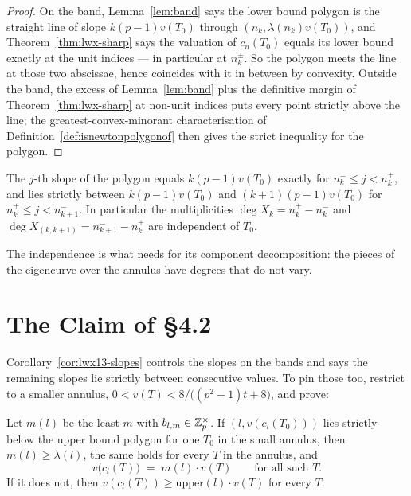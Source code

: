 \begin{proof}
  \leanok
  On the band, Lemma~\ref{lem:band} says the lower bound polygon is the straight line of slope
  $k(p-1)v(T_0)$ through $(n_k, \lambda(n_k)v(T_0))$, and Theorem~\ref{thm:lwx-sharp} says the
  valuation of $c_n(T_0)$ equals its lower bound exactly at the unit indices --- in particular at
  $n_k^{\pm}$.  So the polygon meets the line at those two abscissae, hence coincides with it in
  between by convexity.  Outside the band, the excess of Lemma~\ref{lem:band} plus the definitive
  margin of Theorem~\ref{thm:lwx-sharp} at non-unit indices puts every point strictly above the
  line; the greatest-convex-minorant characterisation of
  Definition~\ref{def:isnewtonpolygonof} then gives the strict inequality for the polygon.
\end{proof}

\begin{corollary}
  \label{cor:lwx13-slopes}
  \leanok
  The $j$-th slope of the polygon equals $k(p-1)v(T_0)$ exactly for
  $n_k^{-}\leq j < n_k^{+}$, and lies strictly between $k(p-1)v(T_0)$ and $(k+1)(p-1)v(T_0)$ for
  $n_k^{+}\leq j < n_{k+1}^{-}$.  In particular the multiplicities
  $\deg X_k = n_k^{+}-n_k^{-}$ and $\deg X_{(k,k+1)} = n_{k+1}^{-}-n_k^{+}$ are independent of
  $T_0$.
\end{corollary}

The independence is what \cite[Theorem 1.3]{LWX} needs for its component decomposition: the
pieces of the eigencurve over the annulus have degrees that do not vary.

\section{The Claim of \S4.2}

Corollary~\ref{cor:lwx13-slopes} controls the slopes on the bands and says the remaining slopes
lie strictly between consecutive values.  To pin those too, \cite[\S4.2]{LWX} restrict to a
smaller annulus, $0 < v(T) < 8/\bigl((p^{2}-1)t+8\bigr)$, and prove:

\begin{theorem}
  \label{thm:lwx-claim}
  \leanok
  Let $m(l)$ be the least $m$ with $b_{l,m}\in\mathbb{Z}_p^{\times}$.  If $(l, v(c_l(T_0)))$ lies strictly
  below the upper bound polygon for one $T_0$ in the small annulus, then $m(l)\geq\lambda(l)$,
  the same holds for every $T$ in the annulus, and
  \[
    v\bigl(c_l(T)\bigr) \;=\; m(l)\cdot v(T) \qquad\text{for all such } T .
  \]
  If it does not, then $v(c_l(T))\geq \mathrm{upper}(l)\cdot v(T)$ for every $T$.
\end{theorem}

